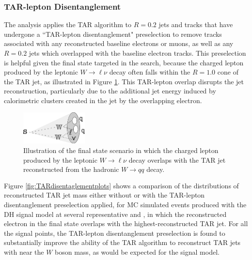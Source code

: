 \subsubsection{TAR-lepton Disentanglement}

The analysis applies the TAR algorithm to \(R=0.2\) \smallR jets and tracks that have undergone a ``TAR-lepton disentanglement" preselection to remove tracks associated with any reconstructed baseline electrons or muons, as well as any \(R=0.2\) jets which overlapped with the baseline electron tracks. This preselection is helpful given the final state targeted in the search, because the charged lepton produced by the leptonic \(W\rightarrow \ell\nu\) decay often falls within the \(R=1.0\) cone of the TAR jet, as illustrated in Figure \ref{fig:TAR_lepton_overlap_illustration}. This TAR-lepton overlap disrupts the jet reconstruction, particularly due to the additional jet energy induced by calorimetric clusters created in the \largeR jet by the overlapping electron.

\begin{figure}[H]
  \centering
     \includegraphics[width = 0.3\textwidth]{Figures/5/lepton_overlap.pdf}
     \caption{Illustration of the final state scenario in which the charged lepton produced by the leptonic \(W\rightarrow \ell\nu\) decay overlaps with the \largeR TAR jet reconstructed from the hadronic \(W\rightarrow qq\) decay.}
     \label{fig:TAR_lepton_overlap_illustration}
  \end{figure}
  
Figure \ref{fig:TARdisentaglementplots} shows a comparison of the distributions of reconstructed TAR jet mass \mTAR either without or with the TAR-lepton disentanglement preselection applied, for MC simulated events produced with the DH signal model at several representative \ms and \mZp, in which the reconstructed electron in the final state overlaps with the highest-\pt reconstructed TAR jet. For all the signal points, the TAR-lepton disentanglement preselection is found to substantially improve the ability of the TAR algorithm to reconstruct TAR jets with \mTAR near the \(W\) boson mass, as would be expected for the signal model.
  
